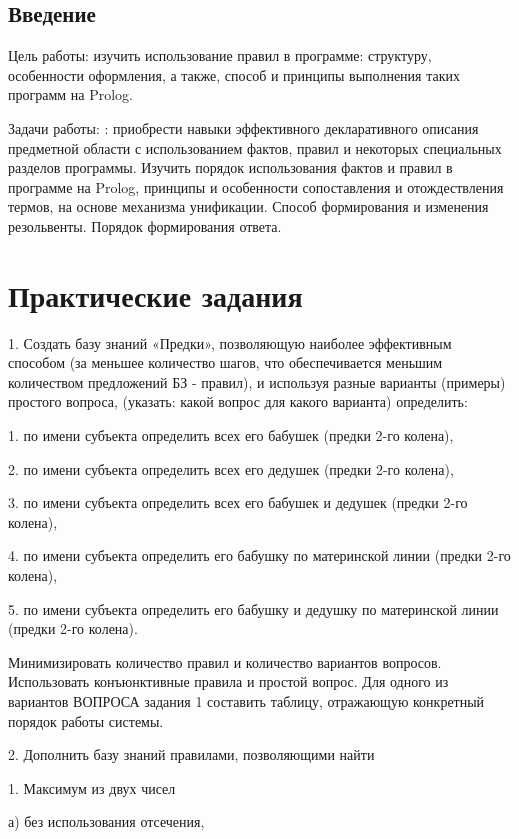 \documentclass[a4paper, 14pt, unknownkeysallowed]{extreport}
\begin{document}

\setcounter{page}{2}

\section*{Введение}
Цель работы: изучить использование правил в программе: структуру,
особенности оформления, а также, способ и принципы выполнения таких программ на
Prolog.

Задачи работы: : приобрести навыки эффективного декларативного описания предметной
области с использованием фактов, правил и некоторых специальных разделов программы.
Изучить порядок использования фактов и правил в программе на Prolog, принципы и
особенности сопоставления и отождествления термов, на основе механизма унификации.
Способ формирования и изменения резольвенты. Порядок формирования ответа.

\chapter{Практические задания}

1. Создать базу знаний «Предки», позволяющую наиболее эффективным способом
(за меньшее количество шагов, что обеспечивается меньшим количеством
предложений БЗ - правил), и используя разные варианты (примеры) простого вопроса,
(указать: какой вопрос для какого варианта) определить:

1. по имени субъекта определить всех его бабушек (предки 2-го колена),

2. по имени субъекта определить всех его дедушек (предки 2-го колена),

3. по имени субъекта определить всех его бабушек и дедушек (предки 2-го
колена),

4. по имени субъекта определить его бабушку по материнской линии (предки 2-го
колена),

5. по имени субъекта определить его бабушку и дедушку по материнской линии
(предки 2-го колена).

Минимизировать количество правил и количество вариантов вопросов. Использовать
конъюнктивные правила и простой вопрос. Для одного из вариантов ВОПРОСА задания 1
составить таблицу, отражающую конкретный порядок работы системы.


2. Дополнить базу знаний правилами, позволяющими найти

1. Максимум из двух чисел

а) без использования отсечения,
\end{document}
